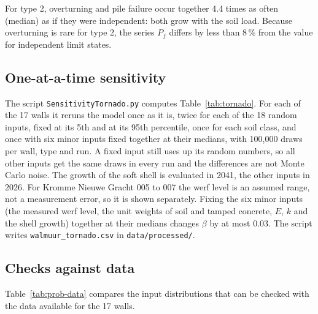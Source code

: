 For type 2, overturning and pile failure
occur together 4.4 times as often (median) as if they were independent: both
grow with the soil load. Because overturning is rare for type 2, the series
$P_f$ differs by less than 8\,\% from the value for independent limit states.

\subsection{One-at-a-time sensitivity}\label{app:prob-tornado}

The script \texttt{SensitivityTornado.py} computes Table~\ref{tab:tornado}.
For each of the 17 walls it reruns the model once as it is, twice for each of
the 18 random inputs, fixed at its 5th and at its 95th percentile, once for
each soil class, and once with six minor inputs fixed together at their
medians, with 100{,}000 draws per wall, type and run. A fixed input still uses
up its random numbers, so all other inputs get the same draws in every run and
the differences are not Monte Carlo noise. The growth of the soft shell is
evaluated in 2041, the other inputs in 2026. For Kromme Nieuwe Gracht 005 to
007 the werf level is an assumed range, not a measurement error, so it is
shown separately. Fixing the six minor inputs (the measured werf level, the
unit weights of soil and tamped concrete, $E$, $k$ and the shell growth)
together at their medians changes $\beta$ by at most 0.03. The script writes
\texttt{walmuur\_tornado.csv} in \texttt{data/processed/}.

\subsection{Checks against data}\label{app:prob-data}

Table~\ref{tab:prob-data} compares the input distributions that can be
checked with the data available for the 17 walls.


